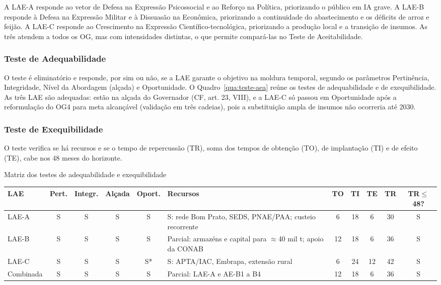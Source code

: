 \documentclass[
	12pt,				%
	openright,			%
	oneside,			%
	a4paper,			%
	chapter=TITLE,		%
	section=TITLE,		%
	english,			%
	french,				%
	spanish,			%
	brazil,				%
 ]{abntex2}
\begin{document}
A LAE-A responde ao vetor de Defesa na Expressão Psicossocial e ao Reforço na
Política, priorizando o público em IA grave. A LAE-B responde à Defesa na
Expressão Militar e à Dissuasão na Econômica, priorizando a continuidade do
abastecimento e os déficits de arroz e feijão. A LAE-C responde ao Crescimento na
Expressão Científico-tecnológica, priorizando a produção local e a transição de
insumos. As três atendem a todos os OG, mas com intensidades distintas, o que
permite compará-las no Teste de Aceitabilidade.

\subsubsection{Teste de Adequabilidade}
O teste é eliminatório e responde, por sim ou não, se a LAE garante o objetivo
na moldura temporal, segundo os parâmetros Pertinência, Integridade, Nível da
Abordagem (alçada) e Oportunidade. O
Quadro~\ref{qua:teste-aea} reúne os testes de adequabilidade e de
exequibilidade. As três LAE são adequadas: estão na alçada do Governador
(CF, art. 23, VIII), e a LAE-C só passou em Oportunidade após a reformulação do
OG4 para meta alcançável (validação em três cadeias), pois a substituição ampla
de insumos não ocorreria até 2030.

\subsubsection{Teste de Exequibilidade}
O teste verifica se há recursos e se o tempo de repercussão (TR), soma dos
tempos de obtenção (TO), de implantação (TI) e de efeito (TE), cabe nos 48 meses
do horizonte.

\begin{quadro}[!htbp]
\centering
\caption{Matriz dos testes de adequabilidade e exequibilidade}
\label{qua:teste-aea}
\footnotesize
\renewcommand{\arraystretch}{1.05}
\setlength{\tabcolsep}{3pt}
\begin{tabularx}{\textwidth}{|l|c|c|c|c|>{\raggedright\arraybackslash}X|c|c|c|c|c|}
\hline
\textbf{LAE} & \textbf{Pert.} & \textbf{Integr.} & \textbf{Alçada} & \textbf{Oport.} & \textbf{Recursos} & \textbf{TO} & \textbf{TI} & \textbf{TE} & \textbf{TR} & \shortstack{\textbf{TR}$\leq$\\\textbf{48?}} \\
\hline
LAE-A & S & S & S & S & S: rede Bom Prato, SEDS, PNAE/PAA; custeio recorrente & 6 & 18 & 6 & 30 & S \\
\hline
LAE-B & S & S & S & S & Parcial: armazéns e capital para $\approx$40 mil t; apoio da CONAB & 12 & 18 & 6 & 36 & S \\
\hline
LAE-C & S & S & S & S* & S: APTA/IAC, Embrapa, extensão rural & 6 & 24 & 12 & 42 & S \\
\hline
Combinada & S & S & S & S & Parcial: LAE-A e AE-B1 a B4 & 12 & 18 & 6 & 36 & S \\
\hline
\end{tabularx}
\end{quadro}
\end{document}
